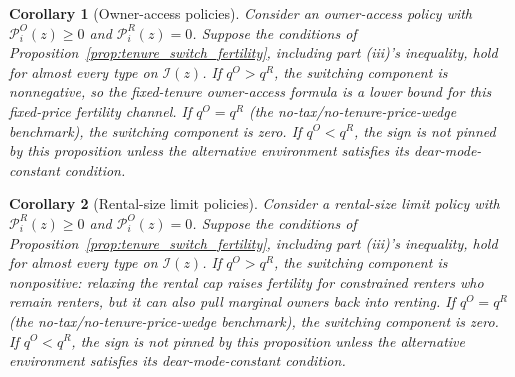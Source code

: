 \documentclass[11pt]{article}
\newtheorem{corollary}{Corollary}
\newcommand{\1}{\mathbf 1}
\begin{document}
\begin{corollary}[Owner-access policies]
\label{cor:switch_owner_access}
Consider an owner-access policy with $\mathcal P_i^O(z)\ge0$ and $\mathcal P_i^R(z)=0$. Suppose the conditions of Proposition~\ref{prop:tenure_switch_fertility}, including part (iii)'s inequality, hold for almost every type on $\mathcal I(z)$. If $q^O>q^R$, the switching component is nonnegative, so the fixed-tenure owner-access formula is a lower bound for this fixed-price fertility channel. If $q^O=q^R$ (the no-tax/no-tenure-price-wedge benchmark), the switching component is zero. If $q^O<q^R$, the sign is not pinned by this proposition unless the alternative environment satisfies its dear-mode-constant condition.
\end{corollary}

\begin{corollary}[Rental-size limit policies]
\label{cor:switch_rental_size_limit}
Consider a rental-size limit policy with $\mathcal P_i^R(z)\ge0$ and $\mathcal P_i^O(z)=0$. Suppose the conditions of Proposition~\ref{prop:tenure_switch_fertility}, including part (iii)'s inequality, hold for almost every type on $\mathcal I(z)$. If $q^O>q^R$, the switching component is nonpositive: relaxing the rental cap raises fertility for constrained renters who remain renters, but it can also pull marginal owners back into renting. If $q^O=q^R$ (the no-tax/no-tenure-price-wedge benchmark), the switching component is zero. If $q^O<q^R$, the sign is not pinned by this proposition unless the alternative environment satisfies its dear-mode-constant condition.
\end{corollary}

\clearpage
\end{document}

